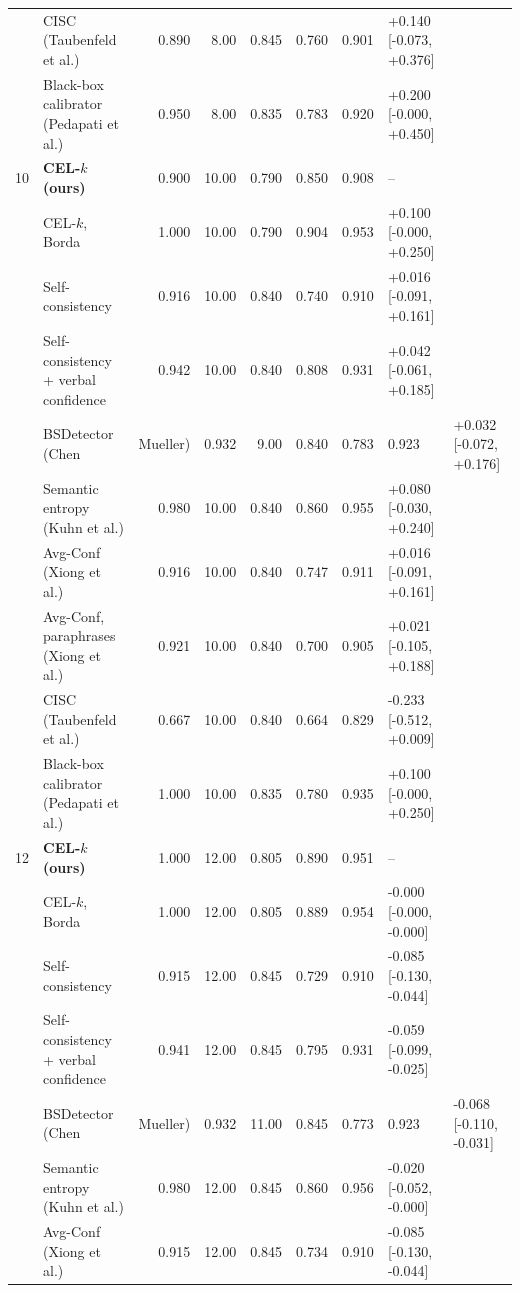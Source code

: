 \begin{table}[t]
\begin{tabular}{llrrrrrl}
 & CISC (Taubenfeld et al.) & 0.890 & 8.00 & 0.845 & 0.760 & 0.901 & +0.140 [-0.073, +0.376] \\
 & Black-box calibrator (Pedapati et al.) & 0.950 & 8.00 & 0.835 & 0.783 & 0.920 & +0.200 [-0.000, +0.450] \\
10 & \textbf{CEL-$k$ (ours)} & 0.900 & 10.00 & 0.790 & 0.850 & 0.908 & -- \\
 & \quad CEL-$k$, Borda & 1.000 & 10.00 & 0.790 & 0.904 & 0.953 & +0.100 [-0.000, +0.250] \\
 & Self-consistency & 0.916 & 10.00 & 0.840 & 0.740 & 0.910 & +0.016 [-0.091, +0.161] \\
 & Self-consistency + verbal confidence & 0.942 & 10.00 & 0.840 & 0.808 & 0.931 & +0.042 [-0.061, +0.185] \\
 & BSDetector (Chen & Mueller) & 0.932 & 9.00 & 0.840 & 0.783 & 0.923 & +0.032 [-0.072, +0.176] \\
 & Semantic entropy (Kuhn et al.) & 0.980 & 10.00 & 0.840 & 0.860 & 0.955 & +0.080 [-0.030, +0.240] \\
 & Avg-Conf (Xiong et al.) & 0.916 & 10.00 & 0.840 & 0.747 & 0.911 & +0.016 [-0.091, +0.161] \\
 & Avg-Conf, paraphrases (Xiong et al.) & 0.921 & 10.00 & 0.840 & 0.700 & 0.905 & +0.021 [-0.105, +0.188] \\
 & CISC (Taubenfeld et al.) & 0.667 & 10.00 & 0.840 & 0.664 & 0.829 & -0.233 [-0.512, +0.009] \\
 & Black-box calibrator (Pedapati et al.) & 1.000 & 10.00 & 0.835 & 0.780 & 0.935 & +0.100 [-0.000, +0.250] \\
12 & \textbf{CEL-$k$ (ours)} & 1.000 & 12.00 & 0.805 & 0.890 & 0.951 & -- \\
 & \quad CEL-$k$, Borda & 1.000 & 12.00 & 0.805 & 0.889 & 0.954 & -0.000 [-0.000, -0.000] \\
 & Self-consistency & 0.915 & 12.00 & 0.845 & 0.729 & 0.910 & -0.085 [-0.130, -0.044] \\
 & Self-consistency + verbal confidence & 0.941 & 12.00 & 0.845 & 0.795 & 0.931 & -0.059 [-0.099, -0.025] \\
 & BSDetector (Chen & Mueller) & 0.932 & 11.00 & 0.845 & 0.773 & 0.923 & -0.068 [-0.110, -0.031] \\
 & Semantic entropy (Kuhn et al.) & 0.980 & 12.00 & 0.845 & 0.860 & 0.956 & -0.020 [-0.052, -0.000] \\
 & Avg-Conf (Xiong et al.) & 0.915 & 12.00 & 0.845 & 0.734 & 0.910 & -0.085 [-0.130, -0.044] \\

\end{tabular}
\end{table}
